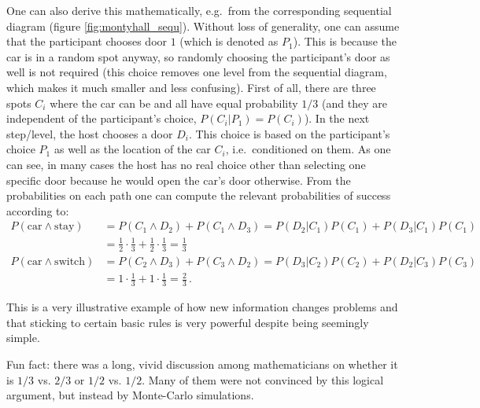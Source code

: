 \begin{ex}
One can also derive this mathematically, e.g.~from the corresponding sequential diagram (figure \ref{fig:montyhall_sequ}). Without loss of generality, one can assume that the participant chooses door $1$ (which is denoted as $P_1$). This is because the car is in a random spot anyway, so randomly choosing the participant's door as well is not required (this choice removes one level from the sequential diagram, which makes it much smaller and less confusing). First of all, there are three spots $C_i$ where the car can be and all have equal probability $1 / 3$ (and they are independent of the participant's choice, $P(C_i | P_1) = P(C_i)$). In the next step/level, the host chooses a door $D_i$. This choice is based on the participant's choice $P_1$ as well as the location of the car $C_i$, i.e.~conditioned on them. As one can see, in many cases the host has no real choice other than selecting one specific door because he would open the car's door otherwise. From the probabilities on each path one can compute the relevant probabilities of success according to:
\begin{align*}
P(\text{car} \land \text{stay}) &= P(C_1 \land D_2) + P(C_1 \land D_3) = P(D_2 | C_1) P(C_1) + P(D_3 | C_1) P(C_1)
\\
&= \frac{1}{2} \cdot \frac{1}{3} + \frac{1}{2} \cdot \frac{1}{3} = \frac{1}{3}
\\
P(\text{car} \land \text{switch}) &= P(C_2 \land D_3) + P(C_3 \land D_2) = P(D_3 | C_2) P(C_2) + P(D_2 | C_3) P(C_3)
\\
&= 1 \cdot \frac{1}{3} + 1 \cdot \frac{1}{3} = \frac{2}{3} \, .
\end{align*}

This is a very illustrative example of how new information changes problems and that sticking to certain basic rules is very powerful despite being seemingly simple.

Fun fact: there was a long, vivid discussion among mathematicians on whether it is $1 / 3$ vs. $2 / 3$ or $1 / 2$ vs. $1 / 2$. Many of them were not convinced by this logical argument, but instead by Monte-Carlo simulations.
\end{ex}



